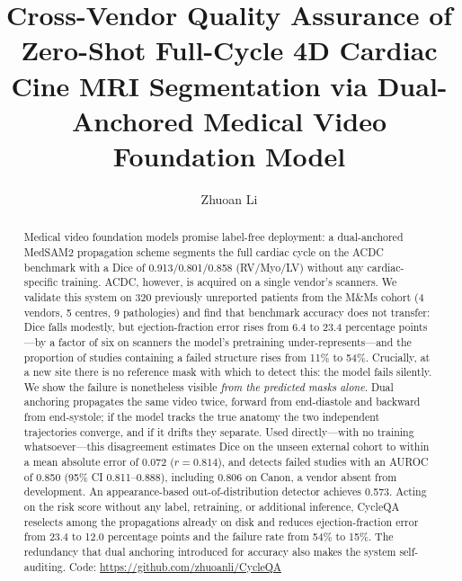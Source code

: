 \documentclass[runningheads]{llncs}
\newcommand{\CQ}{CycleQA}
\begin{document}
\title{Cross-Vendor Quality Assurance of Zero-Shot Full-Cycle 4D Cardiac Cine MRI
Segmentation via Dual-Anchored Medical Video Foundation Model}

\author{Zhuoan Li}

\maketitle

\begin{abstract}
Medical video foundation models promise label-free deployment: a dual-anchored MedSAM2
propagation scheme segments the full cardiac cycle on the ACDC benchmark with a Dice of
0.913/0.801/0.858 (RV/Myo/LV) without any cardiac-specific training. ACDC, however, is
acquired on a single vendor's scanners. We validate this system on 320 previously
unreported patients from the M\&Ms cohort (4 vendors, 5 centres, 9 pathologies) and find
that benchmark accuracy does not transfer: Dice falls modestly, but ejection-fraction
error rises from 6.4 to 23.4 percentage points---by a factor of six on scanners the
model's pretraining under-represents---and the proportion of studies containing a failed
structure rises from 11\% to 54\%. Crucially, at a new site there is no reference mask
with which to detect this: the model fails silently. We show the failure is nonetheless
visible \emph{from the predicted masks alone}. Dual anchoring propagates the same video
twice, forward from end-diastole and backward from end-systole; if the model tracks the
true anatomy the two independent trajectories converge, and if it drifts they separate.
Used directly---with no training whatsoever---this disagreement estimates Dice on the
unseen external cohort to within a mean absolute error of 0.072 ($r=0.814$), and detects
failed studies with an AUROC of 0.850 (95\% CI 0.811--0.888), including 0.806 on Canon, a
vendor absent from development. An appearance-based out-of-distribution detector achieves
0.573. Acting on the risk score without any label, retraining, or additional inference,
\CQ{} reselects among the propagations already on disk and reduces ejection-fraction error
from 23.4 to 12.0 percentage points and the failure rate from 54\% to 15\%. The redundancy
that dual anchoring introduced for accuracy also makes the system self-auditing. Code:
\url{https://github.com/zhuoanli/CycleQA}
\end{abstract}
\end{document}
